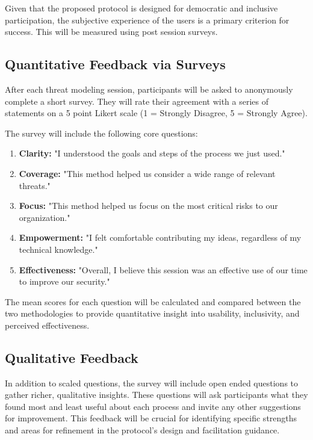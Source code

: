 Given that the proposed protocol is designed 
for democratic and inclusive
participation, the subjective experience of the users is a primary criterion for
success. This will be measured using post session surveys.

\subsection{Quantitative Feedback via Surveys}
\label{subsec:quantitative_feedback}

After each threat modeling session, participants will be asked to anonymously
complete a short survey. They will rate their agreement with a series of
statements on a 5 point Likert scale (1 = Strongly Disagree, 5 = Strongly
Agree).

The survey will include the following core questions:

\begin{enumerate}
\item \textbf{Clarity:} "I understood the goals and steps of the process we just used."
\item \textbf{Coverage:} "This method helped us consider a wide range of relevant threats."
\item \textbf{Focus:} "This method helped us focus on the most critical risks to our organization."
\item \textbf{Empowerment:} "I felt comfortable contributing my ideas, regardless of my technical knowledge."
\item \textbf{Effectiveness:} "Overall, I believe this session was an effective use of our time to improve our security."
\end{enumerate}

The mean scores for each question will be calculated and compared between the
two methodologies to provide quantitative insight into usability, inclusivity,
and perceived effectiveness.

\subsection{Qualitative Feedback}
\label{subsec:qualitative_feedback}

In addition to scaled questions, the survey will include open ended questions to
gather richer, qualitative insights. These questions will ask participants what
they found most and least useful about each process and invite any other
suggestions for improvement. This feedback will be crucial for identifying
specific strengths and areas for refinement in the protocol's design and
facilitation guidance.

